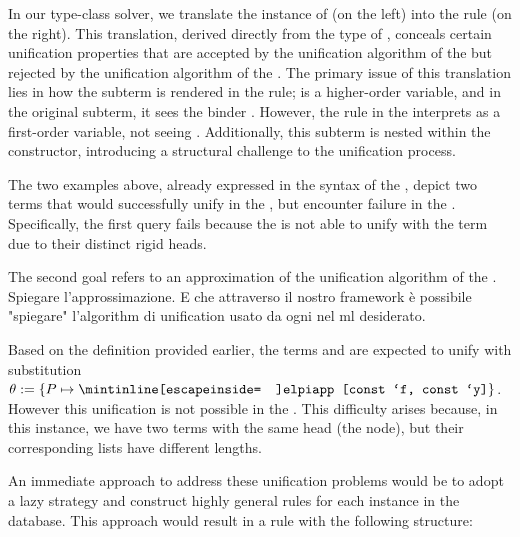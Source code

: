 \documentclass{rapport}
\begin{document}
\noindent In our type-class solver, we translate the  instance
of \coq (on the left) into the \elpi rule (on the right). This translation, derived
directly from the type of , conceals certain unification
properties that are accepted by the unification algorithm of the \ol but 
rejected by the unification algorithm of the \ml. The primary issue of this
translation lies in how the subterm  is rendered in
the \ml rule;  is a higher-order variable, and in the original subterm, it
sees the binder . However, the rule in the \ml interprets  as a 
first-order variable, not seeing . Additionally, this subterm is
nested within the  constructor, introducing a structural challenge 
to the unification process.

%

\noindent The two examples above, already expressed in the syntax of the \ml,
depict two terms that would successfully unify in the \ol, but encounter failure
in the \ml. Specifically, the first query fails because the \ml is not able to unify  with the term  due to their distinct rigid heads. 

The second goal refers to an approximation of the unification algorithm of the \ol. Spiegare l'approssimazione. E che
attraverso il nostro framework è possibile "spiegare" l'algorithm di unification
usato da ogni \ol nel ml desiderato. 

Based on the definition provided earlier, the terms  and  are expected to unify with substitution $\theta := \{P
\mapsto \texttt{\elpiIn{app [const `f, const `y]}} \}$. However this unification
is not possible in the \ml. This difficulty arises because, in this instance,
we have two terms with the same head
(the  node), but their corresponding lists have different lengths.

An immediate approach to address these unification problems
would be to adopt a lazy strategy and construct highly general rules for each instance in the database.
This approach would result in a rule with the following structure:
\end{document}
